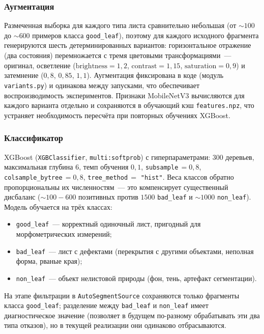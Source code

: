 \subsubsection*{Аугментация}

Размеченная выборка для каждого типа листа сравнительно небольшая (от
$\sim 100$ до $\sim 600$ примеров класса \texttt{good\_leaf}), поэтому для
каждого исходного фрагмента генерируются шесть детерминированных вариантов:
горизонтальное отражение (два состояния) перемножается с тремя цветовыми
трансформациями~--- оригинал, осветление ($\text{brightness}=1{,}2$,
$\text{contrast}=1{,}15$, $\text{saturation}=0{,}9$) и затемнение ($0{,}8$,
$0{,}85$, $1{,}1$). Аугментация фиксирована в коде (модуль \texttt{variants.py})
и одинакова между запусками, что обеспечивает воспроизводимость экспериментов.
Признаки MobileNetV3 вычисляются для каждого варианта отдельно и сохраняются в
обучающий кэш \texttt{features.npz}, что устраняет необходимость пересчёта при
повторных обучениях XGBoost.

\subsubsection*{Классификатор}

XGBoost (\texttt{XGBClassifier}, \texttt{multi:softprob}) с гиперпараметрами:
$300$ деревьев, максимальная глубина $6$, темп обучения $0{,}1$,
\texttt{subsample}$\,= 0{,}8$, \texttt{colsample\_bytree}$\,= 0{,}8$,
\texttt{tree\_method}$\,=$ \texttt{"hist"}. Веса классов обратно пропорциональны
их численностям~--- это компенсирует существенный дисбаланс
($\sim 100\!-\!600$ позитивных против $1500$ \texttt{bad\_leaf} и $\sim 1000$
\texttt{non\_leaf}). Модель обучается на трёх классах:

\begin{itemize}
    \item \texttt{good\_leaf}~--- корректный одиночный лист, пригодный для
          морфометрических измерений;
    \item \texttt{bad\_leaf}~--- лист с дефектами (перекрытия с другими
          объектами, неполная форма, рваные края);
    \item \texttt{non\_leaf}~--- объект нелистовой природы (фон, тень, артефакт
          сегментации).
\end{itemize}

На этапе фильтрации в \texttt{AutoSegmentSource} сохраняются только фрагменты класса
\texttt{good\_leaf}; разделение между \texttt{bad\_leaf} и \texttt{non\_leaf}
имеет диагностическое значение (позволяет в будущем по-разному обрабатывать
эти два типа отказов), но в текущей реализации они одинаково отбрасываются.

